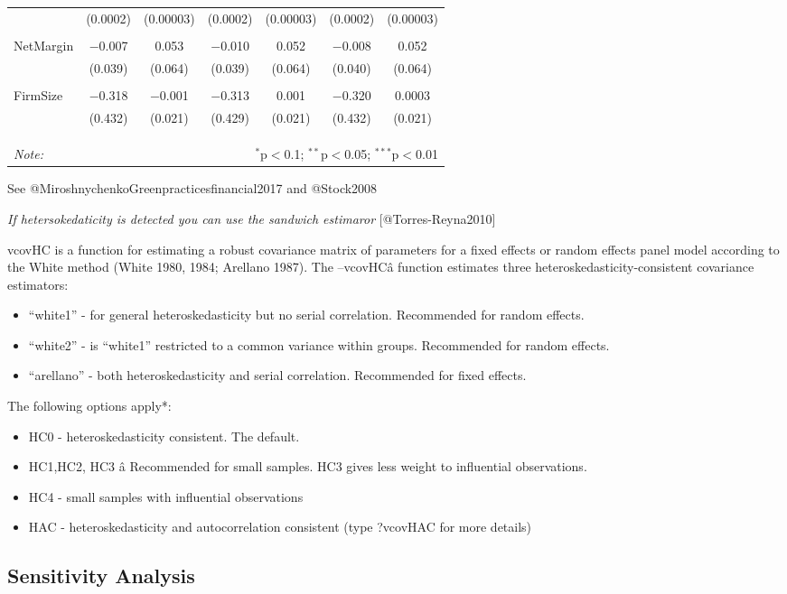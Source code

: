 \documentclass[]{article}
\providecommand{\tightlist}{%
  \setlength{\itemsep}{0pt}\setlength{\parskip}{0pt}}
\begin{document}
\begin{table}[h]
\begin{tabular}{@{\extracolsep{1pt}}lcccccc}
  & (0.0002) & (0.00003) & (0.0002) & (0.00003) & (0.0002) & (0.00003) \\ 
  & & & & & & \\ 
 NetMargin & $-$0.007 & 0.053 & $-$0.010 & 0.052 & $-$0.008 & 0.052 \\ 
  & (0.039) & (0.064) & (0.039) & (0.064) & (0.040) & (0.064) \\ 
  & & & & & & \\ 
 FirmSize & $-$0.318 & $-$0.001 & $-$0.313 & 0.001 & $-$0.320 & 0.0003 \\ 
  & (0.432) & (0.021) & (0.429) & (0.021) & (0.432) & (0.021) \\ 
  & & & & & & \\ 
\hline \\[-1.8ex] 
\hline 
\hline \\[-1.8ex] 
\textit{Note:}  & \multicolumn{6}{r}{$^{*}$p$<$0.1; $^{**}$p$<$0.05; $^{***}$p$<$0.01} \\ 
\end{tabular} 
\end{table}

See @MiroshnychenkoGreenpracticesfinancial2017 and @Stock2008

\emph{If hetersokedaticity is detected you can use the sandwich
estimaror} {[}@Torres-Reyna2010{]}

vcovHC is a function for estimating a robust covariance matrix of
parameters for a fixed effects or random effects panel model according
to the White method (White 1980, 1984; Arellano 1987). The --vcovHCâ
function estimates three heteroskedasticity-consistent covariance
estimators:

\begin{itemize}
\item
  ``white1'' - for general heteroskedasticity but no serial correlation.
  Recommended for random effects.
\item
  ``white2'' - is ``white1'' restricted to a common variance within
  groups. Recommended for random effects.
\item
  ``arellano'' - both heteroskedasticity and serial correlation.
  Recommended for fixed effects.
\end{itemize}

The following options apply*:

\begin{itemize}
\tightlist
\item
  HC0 - heteroskedasticity consistent. The default.
\item
  HC1,HC2, HC3 â Recommended for small samples. HC3 gives less weight
  to influential observations.
\item
  HC4 - small samples with influential observations
\item
  HAC - heteroskedasticity and autocorrelation consistent (type ?vcovHAC
  for more details)
\end{itemize}

\subsection{Sensitivity Analysis}\label{sensitivity-analysis}
\end{document}
